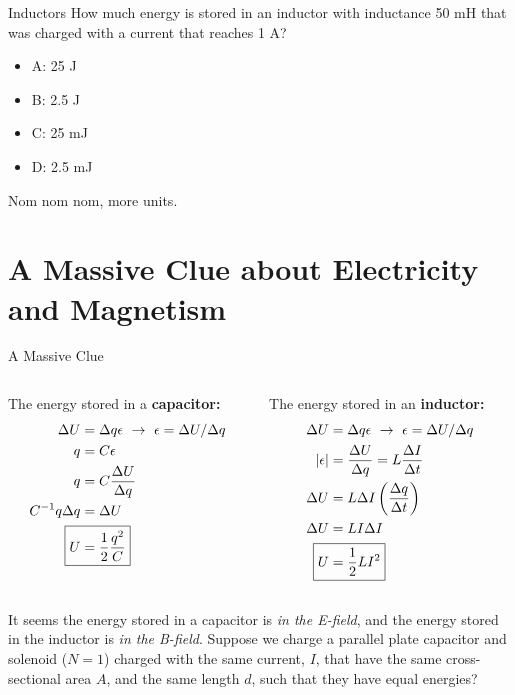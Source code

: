\documentclass{beamer}
\begin{document}
\begin{frame}{Inductors}
How much energy is stored in an inductor with inductance 50 mH that was charged with a current that reaches 1 A?
\begin{itemize}
\item A: 25 J
\item B: 2.5 J
\item C: 25 mJ 
\item D: 2.5 mJ
\end{itemize}
\footnotesize
Nom nom nom, more units.
\end{frame}

\section{A Massive Clue about Electricity and Magnetism}

\begin{frame}{A Massive Clue}
\begin{columns}[T]
\begin{column}{0.5\textwidth}
\footnotesize
The energy stored in a \textbf{\alert{capacitor:}}
\begin{align}
\Delta U &= \Delta q \epsilon ~ \rightarrow ~ \epsilon = \Delta U/\Delta q \\
q &= C \epsilon \\
q &= C \frac{\Delta U}{\Delta q} \\
C^{-1} q \Delta q &= \Delta U \\
\Aboxed{U &= \frac{1}{2}\frac{q^2}{C}}
\end{align}
\end{column}
\begin{column}{0.5\textwidth}
\footnotesize
The energy stored in an \textbf{\alert{inductor:}}
\begin{align}
\Delta U &= \Delta q \epsilon ~ \rightarrow ~ \epsilon = \Delta U/\Delta q \\
|\epsilon| &= \frac{\Delta U}{\Delta q} = L \frac{\Delta I}{\Delta t} \\
\Delta U &= L \Delta I \left( \frac{\Delta q}{\Delta t} \right) \\
\Delta U &= L I \Delta I \\
\Aboxed{ U &= \frac{1}{2} L I^2}
\end{align}
\end{column}
\end{columns}
\footnotesize
It seems the energy stored in a capacitor is \textit{in the E-field}, and the energy stored in the inductor is \textit{in the B-field}.  Suppose we charge a parallel plate capacitor and solenoid ($N = 1$) charged with the same current, $I$, that have the same cross-sectional area $A$, and the same length $d$, such that they have equal energies?
\end{frame}
\end{document}
